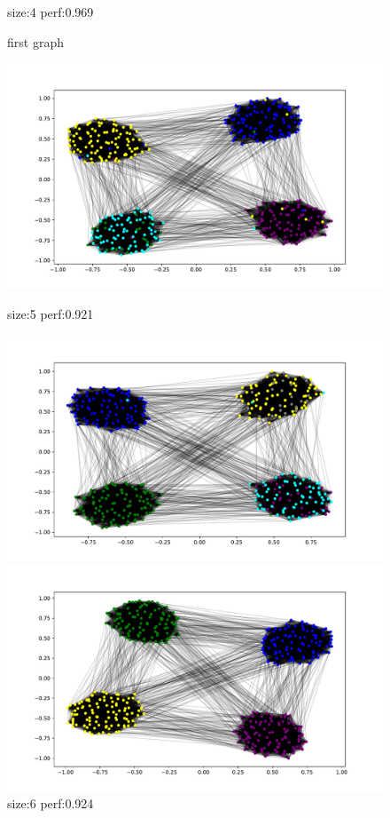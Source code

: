 \documentclass{article}
\begin{document}
\begin{figure}[!ht]
\begin{minipage}{.33\textwidth}
  \caption*{size:4 perf:0.969}
\end{minipage}
\caption{first graph}
\end{figure}



\begin{figure}[!ht]
\centering
\begin{minipage}{.33\textwidth}
  \centering
  \includegraphics[width=\linewidth]{plots/images2/LabelPropagation.pdf}
  \caption*{size:5 perf:0.921}
\end{minipage}%
\begin{minipage}{.33\textwidth}
  \centering
  \includegraphics[width=\linewidth]{plots/images2/ex3minimalDegree.pdf}
  \caption*{size:6 perf:0.924 }
\end{minipage}
\begin{minipage}{.33\textwidth}
  \centering
  \includegraphics[width=\linewidth]{plots/images2/Louvain.pdf}

\end{minipage}
\end{figure}
\end{document}
